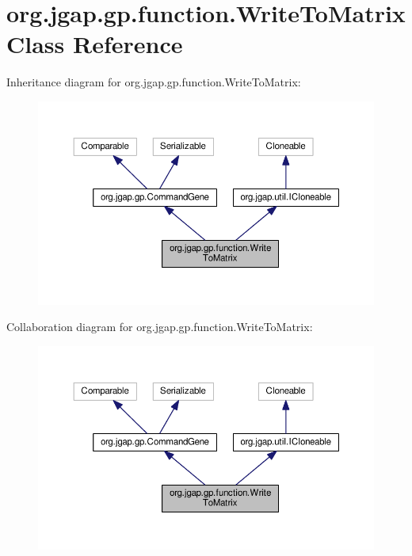 \hypertarget{classorg_1_1jgap_1_1gp_1_1function_1_1_write_to_matrix}{\section{org.\-jgap.\-gp.\-function.\-Write\-To\-Matrix Class Reference}
\label{classorg_1_1jgap_1_1gp_1_1function_1_1_write_to_matrix}
}


Inheritance diagram for org.\-jgap.\-gp.\-function.\-Write\-To\-Matrix\-:
\nopagebreak
\begin{figure}[H]
\begin{center}
\leavevmode
\includegraphics[width=350pt]{classorg_1_1jgap_1_1gp_1_1function_1_1_write_to_matrix__inherit__graph}
\end{center}
\end{figure}


Collaboration diagram for org.\-jgap.\-gp.\-function.\-Write\-To\-Matrix\-:
\nopagebreak
\begin{figure}[H]
\begin{center}
\leavevmode
\includegraphics[width=350pt]{classorg_1_1jgap_1_1gp_1_1function_1_1_write_to_matrix__coll__graph}
\end{center}
\end{figure}
